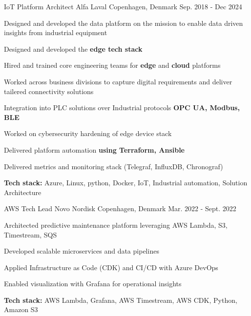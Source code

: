 \begin{cventries}
\cventry
{IoT Platform Architect} %
{Alfa Laval} %
{Copenhagen, Denmark} %
{Sep. 2018 - Dec 2024} %
{ %
\begin{cvitems}
\item Designed and developed the data platform on the mission to enable data driven insights from industrial equipment
\item Designed and developed the \textbf{edge tech stack}
\item Hired and trained core engineering teams for \textbf{edge} and \textbf{cloud} platforms
\item Worked across business divisions to capture digital requirements and deliver tailered connectivity solutions
\item Integration into PLC solutions over Industrial protocols \textbf{OPC UA, Modbus, BLE}
\item Worked on cybersecurity hardening of edge device stack
\item Delivered platform automation \textbf{using Terraform, Ansible}
\item Delivered metrics and monitoring stack (Telegraf, InfluxDB, Chronograf)
\item \textbf{Tech stack:} Azure, Linux, python, Docker, IoT, Industrial automation, Solution Architecture
\end{cvitems}
}



\cventry
{AWS Tech Lead} %
{Novo Nordisk} %
{Copenhagen, Denmark} %
{Mar. 2022 - Sept. 2022} %
{ %
\begin{cvitems}
\item Architected predictive maintenance platform leveraging AWS Lambda, S3, Timestream, SQS
\item Developed scalable microservices and data pipelines
\item Applied Infrastructure as Code (CDK) and CI/CD with Azure DevOps
\item Enabled visualization with Grafana for operational insights
\item \textbf{Tech stack:} AWS Lambda, Grafana, AWS Timestream, AWS CDK, Python, Amazon S3
\end{cvitems}
}




\end{cventries}
